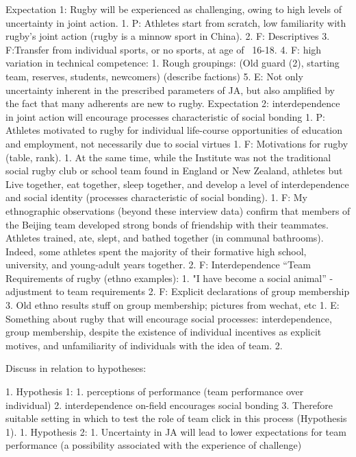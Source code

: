 \begin{CJK}{UTF8}{gbsn}
  Expectation 1: Rugby will be experienced as challenging, owing to high levels of uncertainty in joint action.
                1. P: Athletes start from scratch, low familiarity with rugby’s joint action (rugby is a minnow sport in China).
                2. F: Descriptives
                3. F:Transfer from individual sports, or no sports, at age of ~16-18.
                4. F: high variation in technical competence:
                    1. Rough groupings: (Old guard (2), starting team, reserves, students, newcomers) (describe factions)
                5. E: Not only uncertainty inherent in the prescribed parameters of JA, but also amplified by the fact that many adherents are new to rugby.
  Expectation 2: interdependence in joint action will encourage processes characteristic of social bonding
                1. P: Athletes motivated to rugby for individual life-course opportunities of education and employment, not necessarily due to social virtues
                    1. F: Motivations for rugby (table, rank).
                1. At the same time, while the Institute was not the traditional social rugby club or school team found in England or New Zealand, athletes  but Live together, eat together, sleep together, and develop a level of interdependence and social identity (processes characteristic of social bonding).
                    1. F: My ethnographic observations (beyond these interview data) confirm that members of the Beijing team developed strong bonds of friendship with their teammates.  Athletes trained, ate, slept, and bathed together (in communal bathrooms).  Indeed, some athletes spent the majority of their formative high school, university, and young-adult years together.
                    2. F: Interdependence “Team Requirements of rugby (ethno examples):
                        1. "I have become a social animal” - adjustment to team requirements
                        2. F: Explicit declarations of group membership
                        3. Old ethno results stuff on group membership; pictures from wechat, etc
                1. E: Something about rugby that will encourage social processes: interdependence, group membership, despite the existence of individual incentives as explicit motives, and unfamiliarity of individuals with the idea of team.
                2.

Discuss in relation to hypotheses:

                1. Hypothesis 1:
                    1. perceptions of performance (team performance over individual)
                    2. interdependence on-field encourages social bonding
                    3. Therefore suitable setting in which to test the role of team click in this process (Hypothesis 1).
                1. Hypothesis 2:
                    1. Uncertainty in JA will lead to lower expectations for team performance (a possibility associated with the experience of challenge)








\end{CJK}
